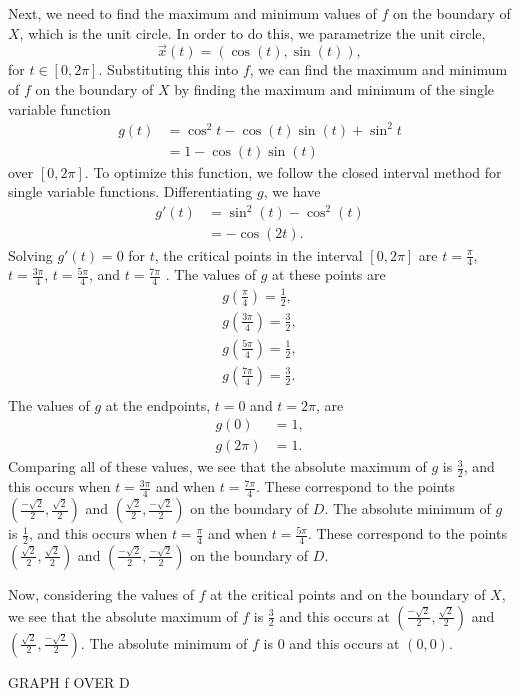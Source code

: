 \documentclass{ximera}
\begin{document}
\begin{example}
Next, we need to find the maximum and minimum values of $f$ on the boundary of $X$, which is the unit circle. In order to do this, we parametrize the unit circle,
\[
\vec{x}(t) = (\cos(t),\sin(t)),
\]
for $t\in [0,2\pi]$. Substituting this into $f$, we can find the maximum and minimum of $f$ on the boundary of $X$ by finding the maximum and minimum of the single variable function
\begin{align*}
g(t) &= \cos^2 t - \cos(t)\sin(t) + \sin^2t\\
&= 1-\cos(t)\sin(t)
\end{align*}
over $[0,2\pi]$. To optimize this function, we follow the closed interval method for single variable functions. Differentiating $g$, we have
\begin{align*}
g'(t) &= \sin^2(t) - \cos^2(t)\\
&= -\cos(2t).
\end{align*}
Solving $g'(t)=0$ for $t$, the critical points in the interval $[0,2\pi]$ are $t=\frac{\pi}{4}$, $t =\frac{3\pi}{4}$, $t = \frac{5\pi}{4}$, and $t = \frac{7\pi}{4}$ . The values of $g$ at these points are
\begin{align*}
g\left(\frac{\pi}{4}\right) = \frac{1}{2},\\
g\left(\frac{3\pi}{4}\right) = \frac{3}{2},\\
g\left(\frac{5\pi}{4}\right) = \frac{1}{2},\\
g\left(\frac{7\pi}{4}\right) = \frac{3}{2}.\\
\end{align*}
The values of $g$ at the endpoints, $t=0$ and $t=2\pi$, are
\begin{align*}
g(0) &= 1,\\
g(2\pi) &= 1.
\end{align*}
Comparing all of these values, we see that the absolute maximum of $g$ is $\frac{3}{2}$, and this occurs when $t=\frac{3\pi}{4}$ and when $t=\frac{7\pi}{4}$. These correspond to the points $\left(\frac{-\sqrt{2}}{2},\frac{\sqrt{2}}{2}\right)$ and $\left(\frac{\sqrt{2}}{2},\frac{-\sqrt{2}}{2}\right)$ on the boundary of $D$. The absolute minimum of $g$ is $\frac{1}{2}$, and this occurs when $t=\frac{\pi}{4}$ and when $t=\frac{5\pi}{4}$. These correspond to the points $\left(\frac{\sqrt{2}}{2},\frac{\sqrt{2}}{2}\right)$ and $\left(\frac{-\sqrt{2}}{2},\frac{-\sqrt{2}}{2}\right)$ on the boundary of $D$.

Now, considering the values of $f$ at the critical points and on the boundary of $X$, we see that the absolute maximum of $f$ is $\frac{3}{2}$ and this occurs at $\left(\frac{-\sqrt{2}}{2},\frac{\sqrt{2}}{2}\right)$ and $\left(\frac{\sqrt{2}}{2},\frac{-\sqrt{2}}{2}\right)$. The absolute minimum of $f$ is $0$ and this occurs at $(0,0)$.

GRAPH f OVER D
\end{example}
\end{document}
